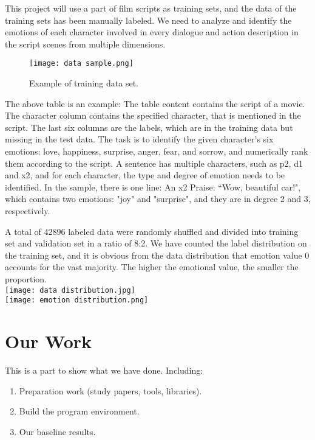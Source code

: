 \documentclass[12pt,twocolumn,letterpaper]{article}
\begin{document}
This project will use a part of film scripts as training sets, and the data of the training sets has been manually labeled. We need to analyze and identify the emotions of each character involved in every dialogue and action description in the script scenes from multiple dimensions. 


\begin{figure*}
\begin{center}
\texttt{[image: data sample.png]}
\end{center}
   \caption{Example of training data set.}
\label{fig:short}
\end{figure*}

The above table is an example: The table content contains the script of a movie. The character column contains the specified character, that is mentioned in the script. The last six columns are the labels, which are in the training data but missing in the test data. The task is to identify the given character’s six emotions: love, happiness, surprise, anger, fear, and sorrow, and numerically rank them according to the script. A sentence has multiple characters, such as p2, d1 and x2, and for each character, the type and degree of emotion needs to be identified. In the sample, there is one line: An x2 Praise: “Wow, beautiful car!", which contains two emotions: "joy" and "surprise", and they are in degree 2 and 3, respectively.

A total of 42896 labeled data were randomly shuffled and divided into training set and validation set in a ratio of 8:2. We have counted the label distribution on the training set, and it is obvious from the data distribution that emotion value 0 accounts for the vast majority. The higher the emotional value, the smaller the proportion.  \\

\texttt{[image: data distribution.jpg]}\\

\texttt{[image: emotion distribution.png]}


\section{Our Work}

This is a part to show what we have done. Including:
\begin{enumerate}
\item Preparation work (study papers, tools, libraries).

\item Build the program environment.

\item Our baseline results.
\end{enumerate}
\end{document}
